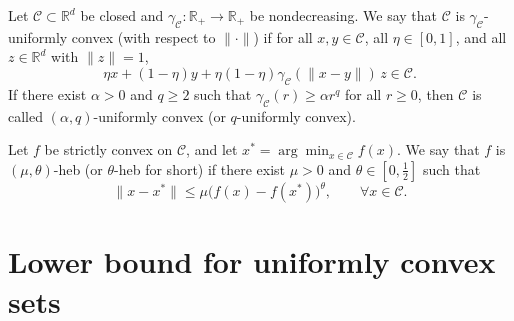 \documentclass{article}
\newcommand{\R}{\mathbb{R}}
\newcommand{\C}{\mathcal{C}}
\newcommand{\norm}[1]{\|#1\|}
\begin{document}
\begin{definition}
    Let $\C \subset\R^d$ be closed and $\gamma_\C :\R_+\to\R_+$ be nondecreasing.
    We say that $\C $ is $\gamma_\C $-uniformly convex (with respect to $\norm{\cdot}$) if
    for all $x,y\in \C $, all $\eta\in[0,1]$, and all $z\in\R^d$ with $\norm{z}=1$,
    \[
    \eta x + (1-\eta)y + \eta(1-\eta)\gamma_\C (\norm{x-y})\,z \in \C .
    \]
    If there exist $\alpha>0$ and $q\ge 2$ such that
    $\gamma_\C (r)\ge \alpha r^q$ for all $r\ge 0$, then $\C $ is called
    $(\alpha,q)$-uniformly convex (or $q$-uniformly convex).
\end{definition}

\begin{definition}
    Let $f$ be strictly convex on $\C $, and let $x^*=\arg\min_{x\in \C }f(x)$.
    We say that $f$ is $(\mu,\theta)$-\gls{heb} (or $\theta$-\gls{heb} for short) if there exist
    $\mu>0$ and $\theta\in[0,\tfrac12]$ such that
    \[
    \norm{x-x^*}\le \mu\bigl(f(x)-f(x^*)\bigr)^\theta,\qquad \forall x\in \C .
    \]
\end{definition}
\section{Lower bound for uniformly convex sets}\label{sec:lower-bound-uc}
\end{document}
